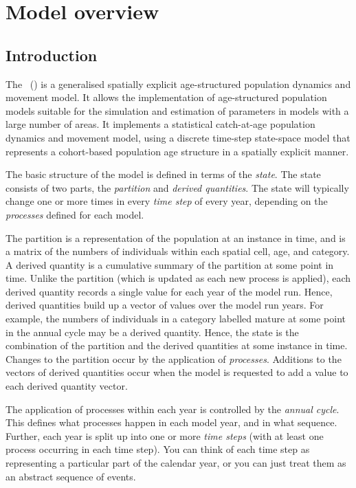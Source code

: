 \section{Model overview\label{sec:overview}}

\subsection{Introduction}

The \SPMName\ (\SPM) is a generalised spatially explicit age-structured population dynamics and movement model. It allows the implementation of age-structured population models suitable for the simulation and estimation of parameters in models with a large number of areas. It implements a statistical catch-at-age population dynamics and movement model, using a discrete time-step state-space model that represents a cohort-based population age structure in a spatially explicit manner. 

The basic structure  of the model is defined in terms of the \emph{state}. The state consists of two parts, the \emph{partition} and \emph{derived quantities}. The state will typically change one or more times in every \emph{time step} of every year, depending on the \emph{processes} defined for each model. 

 The partition is a representation of the population at an instance in time, and is a matrix of the numbers of individuals within each spatial cell, age, and category. A derived quantity is a cumulative summary of the partition at some point in time. Unlike the partition (which is updated as each new process is applied), each derived quantity records a single value for each year of the model run. Hence, derived quantities build up a vector of values over the model run years. For example, the numbers of individuals in a category labelled mature at some point in the annual cycle may be a derived quantity. Hence, the state is the combination of the partition and the derived quantities at some instance in time. Changes to the partition occur by the application of \emph{processes}. Additions to the vectors of derived quantities occur when the model is requested to add a value to each derived quantity vector. 

The application of processes within each year is controlled by the \emph{annual cycle}. This defines what processes happen in each model year, and in what sequence. Further, each year is split up into one or more \emph{time steps} (with at least one process occurring in each time step). You can think of each time step as representing a particular part of the calendar year, or you can just treat them as an abstract sequence of events.


